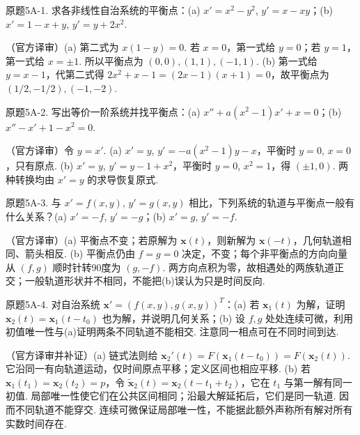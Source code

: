 \begin{exercise}\label{cw:bank-5A-1}原题5A-1. 求各非线性自治系统的平衡点：(a) $x'=x^2-y^2$, $y'=x-xy$；(b) $x'=1-x+y$, $y'=y+2x^2$.\end{exercise}
\begin{solution}（官方译审）(a) 第二式为 $x(1-y)=0$. 若 $x=0$，第一式给 $y=0$；若 $y=1$，第一式给 $x=\pm1$. 所以平衡点为 $(0,0),(1,1),(-1,1)$. (b) 第一式给 $y=x-1$，代第二式得 $2x^2+x-1=(2x-1)(x+1)=0$，故平衡点为 $(1/2,-1/2),(-1,-2)$.\end{solution}
\begin{exercise}\label{cw:bank-5A-2}原题5A-2. 写出等价一阶系统并找平衡点：(a) $x''+a(x^2-1)x'+x=0$；(b) $x''-x'+1-x^2=0$.\end{exercise}
\begin{solution}（官方译审）令 $y=x'$. (a) $x'=y$, $y'=-a(x^2-1)y-x$，平衡时 $y=0$, $x=0$，只有原点. (b) $x'=y$, $y'=y-1+x^2$，平衡时 $y=0$, $x^2=1$，得 $(\pm1,0)$. 两种转换均由 $x'=y$ 的求导恢复原式.\end{solution}
\begin{exercise}\label{cw:bank-5A-3}原题5A-3. 与 $x'=f(x,y)$, $y'=g(x,y)$ 相比，下列系统的轨道与平衡点一般有什么关系？(a) $x'=-f$, $y'=-g$；(b) $x'=g$, $y'=-f$.\end{exercise}
\begin{solution}（官方译审）(a) 平衡点不变；若原解为 $\mathbf x(t)$，则新解为 $\mathbf x(-t)$，几何轨道相同、箭头相反. (b) 平衡点仍由 $f=g=0$ 决定，不变；每个非平衡点的方向向量从 $(f,g)$ 顺时针转90度为 $(g,-f)$. 两方向点积为零，故相遇处的两族轨道正交；一般轨道形状并不相同，不能把(b)误认为只是时间反向.\end{solution}
\begin{exercise}\label{cw:bank-5A-4}原题5A-4. 对自治系统 $\mathbf x'=(f(x,y),g(x,y))^T$：(a) 若 $\mathbf x_1(t)$ 为解，证明 $\mathbf x_2(t)=\mathbf x_1(t-t_0)$ 也为解，并说明几何关系；(b) 设 $f,g$ 处处连续可微，利用初值唯一性与(a)证明两条不同轨道不能相交. 注意同一相点可在不同时间到达.\end{exercise}
\begin{solution}（官方译审并补证）(a) 链式法则给 $\mathbf x_2'(t)=F(\mathbf x_1(t-t_0))=F(\mathbf x_2(t))$. 它沿同一有向轨道运动，仅时间原点平移；定义区间也相应平移. (b) 若 $\mathbf x_1(t_1)=\mathbf x_2(t_2)=p$，令 $\widetilde{\mathbf x}_2(t)=\mathbf x_2(t-t_1+t_2)$，它在 $t_1$ 与第一解有同一初值. 局部唯一性使它们在公共区间相同；沿最大解延拓后，它们是同一轨道. 因而不同轨道不能穿交. 连续可微保证局部唯一性，不能据此额外声称所有解对所有实数时间存在.\end{solution}
